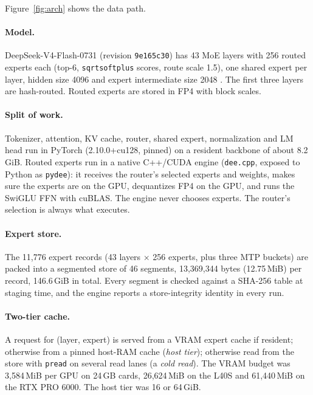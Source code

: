 \documentclass[11pt]{article}
\begin{document}
Figure~\ref{fig:arch} shows the data path.

\paragraph{Model.} DeepSeek-V4-Flash-0731 (revision \texttt{9e165c30}) has 43
MoE layers with 256 routed experts each (top-6, \texttt{sqrtsoftplus} scores,
route scale 1.5), one shared expert per layer, hidden size 4096 and expert
intermediate size 2048 \citep{dsv4flash}. The first three layers are
hash-routed. Routed experts are stored in FP4 with block scales.

\paragraph{Split of work.} Tokenizer, attention, KV cache, router, shared expert,
normalization and LM head run in PyTorch (2.10.0+cu128, pinned) on a resident
backbone of about 8.2\,GiB. Routed experts run in a native C++/CUDA engine
(\texttt{dee.cpp}, exposed to Python as \texttt{pydee}): it receives the router's
selected experts and weights, makes sure the experts are on the GPU, dequantizes
FP4 on the GPU, and runs the SwiGLU FFN with cuBLAS. The engine never chooses
experts. The router's selection is always what executes.

\paragraph{Expert store.} The 11,776 expert records (43 layers $\times$ 256
experts, plus three MTP buckets) are packed into a segmented store of 46
segments, 13,369,344 bytes (12.75\,MiB) per record, 146.6\,GiB in total.
Every segment is checked against a SHA-256 table at staging time, and the
engine reports a store-integrity identity in every run.

\paragraph{Two-tier cache.} A request for (layer, expert) is served from a VRAM
expert cache if resident; otherwise from a pinned host-RAM cache
(\emph{host tier}); otherwise read from the store with \texttt{pread} on
several read lanes (a \emph{cold read}). The VRAM budget was 3,584\,MiB per GPU
on 24\,GB cards, 26,624\,MiB on the L40S and 61,440\,MiB on the RTX PRO 6000. The
host tier was 16 or 64\,GiB.
\end{document}
